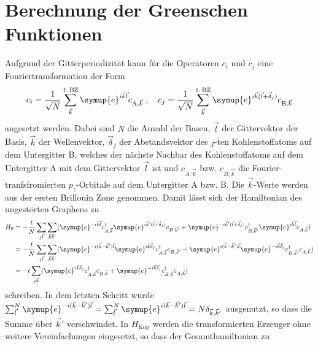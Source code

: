 \section{Berechnung der Greenschen Funktionen}
\label{sec:calc_greensfunction}
Aufgrund der Gitterperiodizität kann für die Operatoren $c_i$ und $c_j$ eine Fouriertransformation der Form 
\begin{equation}
    c_i = \frac{1}{\sqrt{N}} \sum_{\vec{k}}^{1. \, \text{BZ}} \symup{e}^{i\vec{k}\vec{l}} c_{\text{A}, \vec{k}} \; , 
    \quad c_j = \frac{1}{\sqrt{N}} \sum_{\vec{k}}^{1. \, \text{BZ}} \symup{e}^{i\vec{k}(\vec{l}+\vec{\delta}_j)} c_{\text{B}, \vec{k}} \label{eqn:fourier_ladder}
\end{equation}
angesetzt werden.
Dabei sind $N$ die Anzahl der Basen, $\vec{l}$ der Gittervektor der Basis, $\vec{k}$ der Wellenvektor, $\vec{\delta}_j$ der Abstandsvektor
des $j$-ten Kohlenstoffatoms auf dem Untergitter B, welches der nächste Nachbar des Kohlenstoffatoms auf dem Untergitter A mit dem Gittervektor $\vec{l}$ ist 
und $c_{A, \vec{k}}$ bzw. $c_{B, \vec{k}}$ die Fourier-tranfsfromierten $p_z$-Orbitale\cite{anders-fkt} auf dem Untergitter A bzw. B.
Die $\vec{k}$-Werte werden aus der ersten Brillouin Zone genommen.\cite{anders-fkt}
Damit lässt sich der Hamiltonian des ungestörten Graphens zu 
\begin{align*}
    H_0 &= -\frac{t}{N} \sum_{j\vec{l}} \sum_{\vec{k}\vec{k}'} ( \symup{e}^{-i\vec{k}\vec{l}}c^\dagger_{A,\vec{k}} 
    \symup{e}^{i\vec{k}'(\vec{l}+\vec{\delta}_j)}c_{B,\vec{k}'} + \symup{e}^{-i\vec{k}'(\vec{l}+\vec{\delta}_j)} c^\dagger_{B,\vec{k}'} 
    \symup{e}^{i\vec{k}\vec{l}}c_{A,\vec{k}}) \\
    &= -\frac{t}{N} \sum_{j\vec{l}} \sum_{\vec{k}\vec{k}'} ( \symup{e}^{-i(\vec{k}- \vec{k}')\vec{l}}\symup{e}^{i\vec{k}\vec{\delta}_j}c^\dagger_{A,\vec{k}} c_{B,\vec{k}'} + 
    \symup{e}^{i(\vec{k}- \vec{k}')\vec{l}} \symup{e}^{-i\vec{k}\vec{\delta}_j} c^\dagger_{B,\vec{k}'}c_{A,\vec{k}}) \\
    &= -t \sum_{j\vec{k}} ( \symup{e}^{i\vec{k}\vec{\delta}_j}c^\dagger_{A,\vec{k}} c_{B,\vec{k}} + 
    \symup{e}^{-i\vec{k}\vec{\delta_j}} c^\dagger_{B,\vec{k}}c_{A,\vec{k}})
\end{align*}
schreiben.
In dem letzten Schritt wurde $\sum_{\vec{l}}^N \symup{e}^{-i(\vec{k}- \vec{k}')\vec{l}} 
= \sum_{\vec{l}}^N \symup{e}^{i(\vec{k}- \vec{k}')\vec{l}} = N\delta_{\vec{k}, \vec{k}'}$ ausgenutzt, so dass die Summe über $\vec{k}'$ verschwindet.
In $H_\text{Kop}$ werden die transformierten Erzeuger ohne weitere Vereinfachungen eingesetzt,  so dass der Gesamthamiltonian zu 
